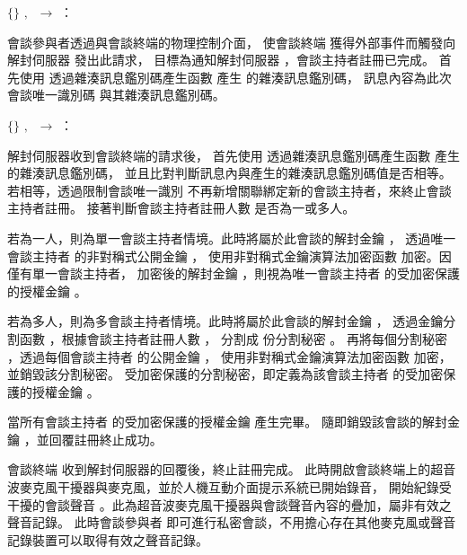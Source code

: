 \begin{pmsgs}
    \item $\{$\DEFsessionID$\}$ $,~$ \DEFmeetingbox $\rightarrow$ \DEFserver：

        會談參與者透過與會談終端的物理控制介面，
    使會談終端 \DEFmeetingbox 獲得外部事件而觸發向解封伺服器 \DEFserver 發出此請求，
    目標為通知解封伺服器 \DEFserver，會談主持者註冊已完成。
    首先使用 \DEFmboxKey 透過雜湊訊息鑑別碼產生函數 \DEFfuncHMAC{} 產生 \DEFsessionID 的雜湊訊息鑑別碼，
    訊息內容為此次會談唯一識別碼 \DEFsessionID 與其雜湊訊息鑑別碼。

    \item $\{\}$ $,~$ \DEFserver $\rightarrow$ \DEFmeetingbox：

        解封伺服器收到會談終端的請求後，
    首先使用 \DEFmboxKey 透過雜湊訊息鑑別碼產生函數 \DEFfuncHMAC{} 產生 \DEFmeetingbox 的雜湊訊息鑑別碼，
    並且比對判斷訊息內與產生的雜湊訊息鑑別碼值是否相等。
    若相等，透過限制會談唯一識別 \DEFsessionID 不再新增關聯綁定新的會談主持者，來終止會談主持者註冊。
    接著判斷會談主持者註冊人數 \DEFowreg 是否為一或多人。

        若為一人，則為單一會談主持者情境。此時將屬於此會談的解封金鑰 \DEFunsealKey，
    透過唯一會談主持者 \DEFowner 的非對稱式公開金鑰 \DEFpublicKey，
    使用非對稱式金鑰演算法加密函數 \DEFfuncEncPK{} 加密。因僅有單一會談主持者，
    加密後的解封金鑰 \DEFunsealKey，則視為唯一會談主持者 \DEFowner 的受加密保護的授權金鑰 \DEFakEnc。

        若為多人，則為多會談主持者情境。此時將屬於此會談的解封金鑰 \DEFunsealKey，
    透過金鑰分割函數 \DEFfuncSSS{}，根據會談主持者註冊人數 \DEFowreg，
    分割成 \DEFowreg 份分割秘密 \DEFsharesAll。
    再將每個分割秘密 \DEFshares，透過每個會談主持者 \DEFowner 的公開金鑰 \DEFpublicKey，
    使用非對稱式金鑰演算法加密函數 \DEFfuncEncPK{} 加密，並銷毀該分割秘密。
    受加密保護的分割秘密，即定義為該會談主持者 \DEFowner 的受加密保護的授權金鑰 \DEFakEnc。

        當所有會談主持者 \DEFowner 的受加密保護的授權金鑰 \DEFakEnc 產生完畢。
    隨即銷毀該會談的解封金鑰 \DEFunsealKey，並回覆註冊終止成功。

        會談終端 \DEFmeetingbox 收到解封伺服器的回覆後，終止註冊完成。
    此時開啟會談終端上的超音波麥克風干擾器與麥克風，並於人機互動介面提示系統已開始錄音，
    開始紀錄受干擾的會談聲音 \DEFrecJ。此為超音波麥克風干擾器與會談聲音內容的疊加，屬非有效之聲音記錄。
    此時會談參與者 \DEFattenderAll 即可進行私密會談，不用擔心存在其他麥克風或聲音記錄裝置可以取得有效之聲音記錄。


\end{pmsgs}
